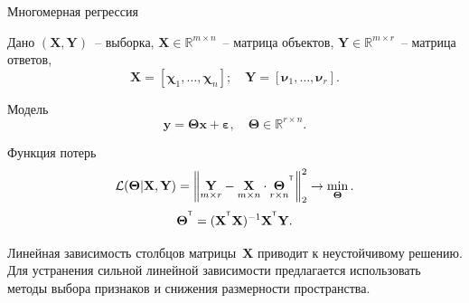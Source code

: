 \documentclass[9pt]{beamer}
\newcommand{\bx}{\mathbf{x}}
\newcommand{\by}{\mathbf{y}}
\newcommand{\bX}{\mathbf{X}}
\newcommand{\bY}{\mathbf{Y}}
\newcommand{\bbR}{\mathbb{R}}
\newcommand{\bchi}{\boldsymbol{\chi}}
\newcommand{\bnu}{\boldsymbol{\nu}}
\newcommand{\bTheta}{\boldsymbol{\Theta}}
\newcommand{\T}{^{\text{\tiny\sffamily\upshape\mdseries T}}}
\begin{document}
\begin{frame}{Многомерная регрессия}
	\begin{block}{Дано}
	$\left( \bX, \bY \right)$~-- выборка, $\bX \in \bbR^{m \times n}$~-- матрица объектов, $\bY \in \bbR^{m \times r}$~-- матрица ответов,
	\[
	\bX = [\bchi_1, \dots, \bchi_n]; \quad \bY =  [\bnu_1, \dots, \bnu_r].
	\]
	\vspace{-0.7cm}
	\end{block}

\begin{block}{Модель}
	\vspace{-0.3cm}
	\[
		\by = \bTheta \bx+ \boldsymbol{\varepsilon}, \quad \bTheta \in \bbR^{r \times n}.
	\]
	\vspace{-0.5cm}
\end{block}
	\begin{block}{Функция потерь}
	\[
	\mathcal{L}(\bTheta | \bX, \bY) = {\left\| \underset{m \times r}{\mathbf{Y}}  - \underset{m \times n}{\bX} \cdot \underset{r \times n}{\bTheta}^{\T} \right\| }_2^2 \rightarrow\min_{\bTheta}.
	\label{eq:error_function}
	\]
	\[
	\bTheta^{\T} = (\bX^{\T} \bX)^{-1} \bX^{\T} \bY.
	\]
	\end{block}
	Линейная зависимость столбцов матрицы~$\bX$ приводит к неустойчивому решению. \\
	Для устранения сильной линейной зависимости предлагается использовать методы выбора признаков и снижения размерности пространства. 
\end{frame}
\end{document}
